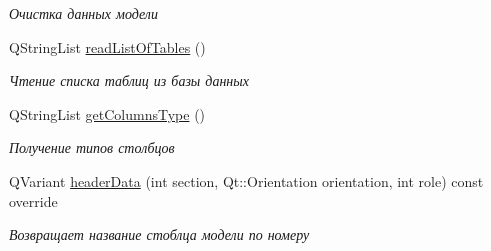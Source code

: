 \begin{DoxyCompactItemize}
\begin{DoxyCompactList}\small\item\em Очистка данных модели \end{DoxyCompactList}\item 
Q\+String\+List \hyperlink{classConverterModel_a7eb359fd8866173131a7dc3b40ba9d8d}{read\+List\+Of\+Tables} ()
\begin{DoxyCompactList}\small\item\em Чтение списка таблиц из базы данных \end{DoxyCompactList}\item 
Q\+String\+List \hyperlink{classConverterModel_a3f16894425efdf6c2b484c6cbd199ee7}{get\+Columns\+Type} ()
\begin{DoxyCompactList}\small\item\em Получение типов столбцов \end{DoxyCompactList}\item 
Q\+Variant \hyperlink{classConverterModel_a91ac4f80ed87ada3b70a14752699cb0c}{header\+Data} (int section, Qt\+::\+Orientation orientation, int role) const override
\begin{DoxyCompactList}\small\item\em Возвращает название стоблца модели по номеру \end{DoxyCompactList}\end{DoxyCompactItemize}
